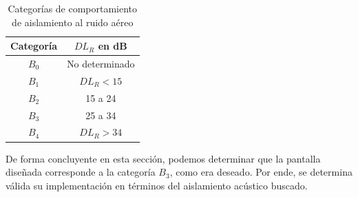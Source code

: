 \begin{table}[H]
\setlength\arrayrulewidth{1pt}
    \centering
    \begin{tabular}{|c|c|} \hline
        \textbf{Categoría} & \textbf{$DL_R$ en dB} \\ \hline \hline
         $B_0$ & No determinado \\ \hline
         $B_1$ & $DL_R < 15$  \\ \hline
         $B_2$ & 15 a 24 \\ \hline
         $B_3$ & 25 a 34 \\ \hline
         $B_4$ & $DL_R > 34$ \\ \hline
    \end{tabular}
    \caption{Categorías de comportamiento de aislamiento al ruido aéreo}
    \label{tab:categorias_aislamiento}
\end{table}


\par De forma concluyente en esta sección, podemos determinar que la pantalla diseñada  corresponde a la categoría $B_3$, como era deseado. Por ende, se determina válida su implementación en términos del aislamiento acústico buscado. 